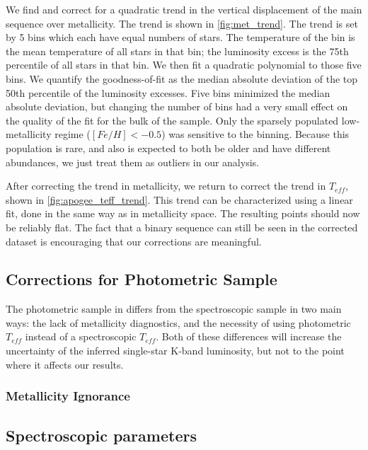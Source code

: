 \documentclass[manuscript]{aastex6}
\newcommand{\Teff}{\ensuremath{T_{eff}}}
\begin{document}
We find and correct for a quadratic trend in the vertical displacement of the
main sequence over metallicity. The trend is shown in \cref{fig:met_trend}.
The trend is set by 5 bins which each have equal numbers of stars. The
temperature of the bin is the mean temperature of all stars in that bin; the
luminosity excess is the 75th percentile of all stars in that bin. We then fit
a quadratic polynomial to those five bins. We quantify the goodness-of-fit as
the median absolute deviation of the top 50th percentile of the luminosity
excesses. Five bins minimized the median absolute deviation, but changing the
number of bins had a very small effect on the quality of the fit for the bulk
of the sample. Only the sparsely populated low-metallicity regime (\([Fe/H] <
-0.5\)) was sensitive to the binning. Because this population is rare, and also
is expected to both be older and have different abundances, we just treat them
as outliers in our analysis.

After correcting the trend in metallicity, we return to correct the trend in
\Teff{}, shown in \cref{fig:apogee_teff_trend}. This trend can be characterized
using a linear fit, done in the same way as in metallicity space. The resulting
points should now be reliably flat. The fact that a binary sequence can still
be seen in the corrected dataset is encouraging that our corrections are
meaningful.

\subsection{Corrections for Photometric Sample}

The photometric sample in \citep{McQuillan14} differs from the spectroscopic
sample in two main ways: the lack of metallicity diagnostics, and the necessity
of using photometric \Teff{} instead of a spectroscopic \Teff{}. Both of these
differences will increase the uncertainty of the inferred single-star K-band
luminosity, but not to the point where it affects our results.

\subsubsection{Metallicity Ignorance}



\subsection{Spectroscopic parameters}
\end{document}
